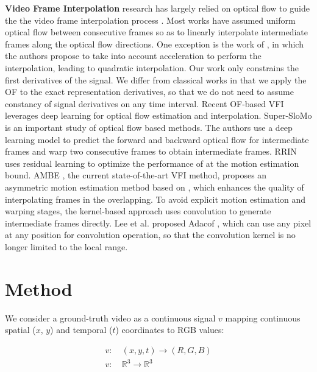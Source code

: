 \documentclass{article}
\begin{document}
\textbf{Video Frame Interpolation} research has largely relied on optical flow to guide the the video frame interpolation process \cite{baker2011database} \cite{barron1994performance} \cite{herbst2009occlusion}.
Most works have assumed uniform optical flow between consecutive frames so as to linearly interpolate intermediate frames along the optical flow directions.
One exception is the work of \cite{xu2019quadratic}, in which the authors propose to take into account acceleration to perform the interpolation,
leading to quadratic interpolation.
Our work only constrains the first derivatives of the signal.
We differ from classical works in that we apply the OF to the exact representation derivatives,
so that we do not need to assume constancy of signal derivatives on any time interval.
Recent OF-based VFI leverages deep learning for optical flow estimation and interpolation.
Super-SloMo \cite{jiang2018super} is an important study of optical flow based methods.
The authors use a deep learning model to predict the forward and backward optical flow for intermediate frames and warp two consecutive frames to obtain intermediate frames.
RRIN \cite{li2020video} uses residual learning to optimize the performance of \cite{jiang2018super} at the motion estimation bound.
AMBE \cite{park2021asymmetric}, the current state-of-the-art VFI method, proposes an asymmetric motion estimation method based on \cite{park2020bmbc}, which enhances the quality of interpolating frames in the overlapping.
To avoid explicit motion estimation and warping stages, the kernel-based approach uses convolution to generate intermediate frames directly.
Lee et al. proposed Adacof \cite{lee2020adacof}, which can use any pixel at any position for convolution operation, so that the convolution kernel is no longer limited to the local range.
\section{Method}
\label{sec_method}
We consider a ground-truth video as a continuous signal $v$ mapping continuous spatial ($x$, $y$) and temporal ($t$) coordinates to RGB values:

\begin{equation}
\begin{aligned}
v:& \: (x, y, t) \rightarrow (R, G, B) \\
v:& \: \mathbb{R}^3 \rightarrow \mathbb{R}^3
\end{aligned}
\end{equation}
\end{document}
